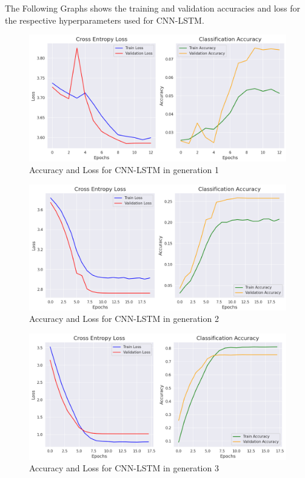 The Following Graphs shows the training and validation accuracies and loss for the respective hyperparameters used for CNN-LSTM.\\
\begin{figure}[h!]
      \centering
      \includegraphics[scale=0.18]{images/GA_CNN_LSTM_1.png}
      \caption{Accuracy and Loss for CNN-LSTM in generation 1}
  \end{figure}
\begin{figure}[h!]
      \centering
      \includegraphics[scale=0.18]{images/GA_CNN_LSTM_2.png}
      \caption{Accuracy and Loss for CNN-LSTM in generation 2}
  \end{figure}
  \newpage
\begin{figure}[h!]
      \centering
      \includegraphics[scale=0.18]{images/GA_CNN_LSTM_3.png}
      \caption{Accuracy and Loss for CNN-LSTM in generation 3}
  \end{figure}
